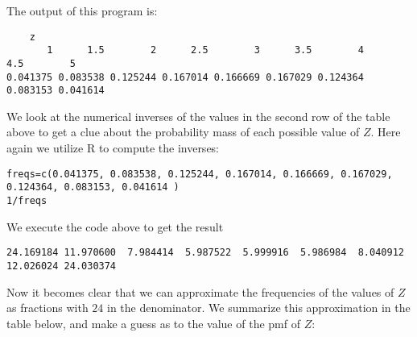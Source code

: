 \documentclass[a4paper,11pt]{article}
\begin{document}
The output of this program is:
\begin{lstlisting}
	z
       1      1.5        2      2.5        3      3.5        4      4.5        5
0.041375 0.083538 0.125244 0.167014 0.166669 0.167029 0.124364 0.083153 0.041614
\end{lstlisting}

We look at the numerical inverses of the values in the second row of the
table above to get a clue about the probability mass of each possible value
of $Z$.  Here again we utilize R to compute the inverses:

\begin{lstlisting}
freqs=c(0.041375, 0.083538, 0.125244, 0.167014, 0.166669, 0.167029, 0.124364, 0.083153, 0.041614 )
1/freqs
\end{lstlisting}

We execute the code above to get the result
\begin{lstlisting}
24.169184 11.970600  7.984414  5.987522  5.999916  5.986984  8.040912 12.026024 24.030374
\end{lstlisting}

Now it becomes clear that we can approximate the frequencies of the values of
$Z$ as fractions with $24$ in the denominator.  We summarize this approximation
in the table below, and make a guess as to the value of the pmf of $Z$:
\end{document}
